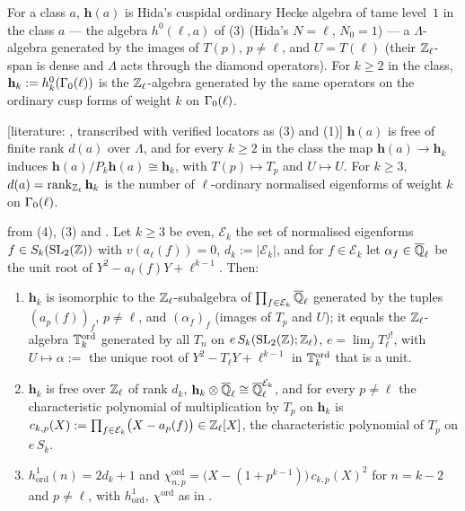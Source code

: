 \documentclass[11pt]{article}
\newcommand{\LIT}[1]{\textsf{[literature: #1]}}   %
\newcommand{\Iw}{\Lambda}                         %
\newcommand{\hcusp}{\mathbf{h}}                   %
\newcommand{\Pk}[1]{P_{#1}}                       %
\newcommand{\Ek}{\mathcal{E}}                     %
\newcommand{\Qlb}{\overline{\Q}_\ell}
\newcommand{\Zl}{\Z_\ell}
\begin{document}
\begin{definition}\label{def:u-hcusp}
For a class $a$, $\hcusp(a)$ is Hida's cuspidal ordinary Hecke algebra of tame level~$1$ in the class $a$ --- the
algebra $h^{0}(\ell,a)$ of (3) (Hida's $N=\ell$, $N_0=1$) --- a $\Iw$-algebra generated by the
images of $T(p)$, $p\ne\ell$, and $U=T(\ell)$ (their $\Zl$-span is dense and $\Iw$ acts through the diamond operators).
For $k\ge2$ in the class, $\hcusp_k:=h^{0}_k(\Ga_0(\ell))$ is the $\Zl$-algebra generated by the same operators on the
ordinary cusp forms of weight $k$ on $\Gamma_0(\ell)$.
\end{definition}

\begin{theorem}\label{thm:u-control}
\LIT{\cite[Thm.~3.1 and Cor.~3.2, p.~250]{hida_ens}, transcribed with verified locators as \HA{thm:hidacontrol}(3) and
\HA{thm:hidaweight}(1)} $\hcusp(a)$ is free of finite rank $d(a)$ over $\Iw$, and for every $k\ge2$ in the class the map
$\hcusp(a)\to\hcusp_k$ induces $\hcusp(a)/\Pk{k}\hcusp(a)\cong\hcusp_k$, with $T(p)\mapsto T_p$ and $U\mapsto U$. For $k\ge3$,
$d(a)=\rank_{\Zl}\hcusp_k$ is the number of $\ell$-ordinary normalised eigenforms of weight $k$ on $\Gamma_0(\ell)$.
\end{theorem}

\begin{lemma}\label{lem:u-levelone}
\PROVED{} from (4), (3) and . Let $k\ge3$ be even, $\Ek_k$ the set of normalised eigenforms $f\in S_k(\mathrm{SL}_2(\mathbb{Z}))$ with
$v(a_\ell(f))=0$, $d_k:=|\Ek_k|$, and for $f\in\Ek_k$ let $\alpha_f\in\Qlb$ be the unit root of $Y^{2}-a_\ell(f)Y+\ell^{k-1}$.
Then:
\begin{enumerate}
\item $\hcusp_k$ is isomorphic to the $\Zl$-subalgebra of $\prod_{f\in\Ek_k}\Qlb$ generated by the tuples $(a_p(f))_f$,
  $p\ne\ell$, and $(\alpha_f)_f$ (images of $T_p$ and $U$); it equals the $\Zl$-algebra $\mathbb{T}^{\mathrm{ord}}_k$ generated by all
  $T_n$ on $e\,S_k(\SL_2(\Z);\Zl)$, $e=\lim_jT_\ell^{\,j!}$, with $U\mapsto\alpha:=$ the unique root of $Y^{2}-T_\ell Y+\ell^{k-1}$ in
  $\mathbb{T}^{\mathrm{ord}}_k$ that is a unit.
\item $\hcusp_k$ is free over $\Zl$ of rank $d_k$, $\hcusp_k\otimes\Qlb\cong\Qlb^{\Ek_k}$, and for every $p\ne\ell$ the
  characteristic polynomial of multiplication by $T_p$ on $\hcusp_k$ is
  $c_{k,p}(X):=\prod_{f\in\Ek_k}\bigl(X-a_p(f)\bigr)\in\Zl[X]$, the characteristic polynomial of $T_p$ on $e\,S_k$.
\item $h^{1}_{\mathrm{ord}}(n)=2d_k+1$ and $\chi^{\mathrm{ord}}_{n,p}=\bigl(X-(1+p^{k-1})\bigr)\,c_{k,p}(X)^{2}$ for $n=k-2$ and
  $p\ne\ell$, with $h^{1}_{\mathrm{ord}}$, $\chi^{\mathrm{ord}}$ as in .
\end{enumerate}
\end{lemma}
\end{document}
